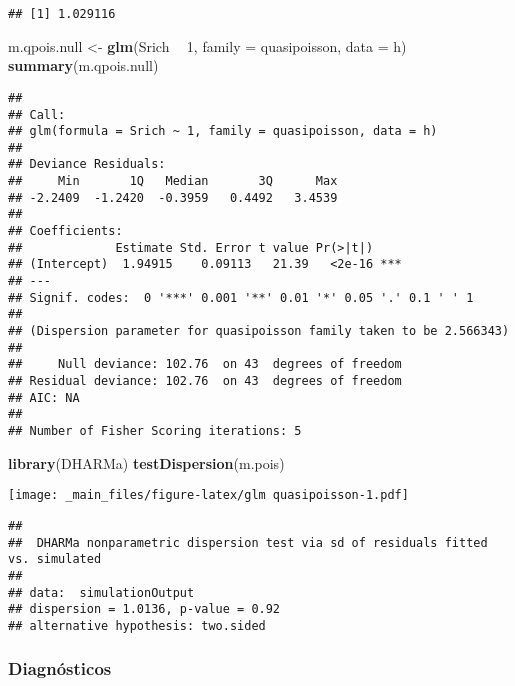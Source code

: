 \documentclass[
]{book}
\newenvironment{Shaded}{\begin{snugshade}}{\end{snugshade}}
\newcommand{\DataTypeTok}[1]{\textcolor[rgb]{0.13,0.29,0.53}{#1}}
\newcommand{\DecValTok}[1]{\textcolor[rgb]{0.00,0.00,0.81}{#1}}
\newcommand{\KeywordTok}[1]{\textcolor[rgb]{0.13,0.29,0.53}{\textbf{#1}}}
\newcommand{\NormalTok}[1]{#1}
\newcommand{\OperatorTok}[1]{\textcolor[rgb]{0.81,0.36,0.00}{\textbf{#1}}}
\newcommand{\StringTok}[1]{\textcolor[rgb]{0.31,0.60,0.02}{#1}}
\begin{document}
\begin{verbatim}
## [1] 1.029116
\end{verbatim}

\begin{Shaded}
\begin{Highlighting}[]
\NormalTok{m.qpois.null <-}\StringTok{ }\KeywordTok{glm}\NormalTok{(Srich }\OperatorTok{~}\StringTok{ }\DecValTok{1}\NormalTok{, }\DataTypeTok{family =}\NormalTok{ quasipoisson, }\DataTypeTok{data =}\NormalTok{ h)}
\KeywordTok{summary}\NormalTok{(m.qpois.null)}
\end{Highlighting}
\end{Shaded}

\begin{verbatim}
## 
## Call:
## glm(formula = Srich ~ 1, family = quasipoisson, data = h)
## 
## Deviance Residuals: 
##     Min       1Q   Median       3Q      Max  
## -2.2409  -1.2420  -0.3959   0.4492   3.4539  
## 
## Coefficients:
##             Estimate Std. Error t value Pr(>|t|)    
## (Intercept)  1.94915    0.09113   21.39   <2e-16 ***
## ---
## Signif. codes:  0 '***' 0.001 '**' 0.01 '*' 0.05 '.' 0.1 ' ' 1
## 
## (Dispersion parameter for quasipoisson family taken to be 2.566343)
## 
##     Null deviance: 102.76  on 43  degrees of freedom
## Residual deviance: 102.76  on 43  degrees of freedom
## AIC: NA
## 
## Number of Fisher Scoring iterations: 5
\end{verbatim}

\begin{Shaded}
\begin{Highlighting}[]
\KeywordTok{library}\NormalTok{(DHARMa)}
\KeywordTok{testDispersion}\NormalTok{(m.pois)}
\end{Highlighting}
\end{Shaded}

\texttt{[image: \_main\_files/figure-latex/glm quasipoisson-1.pdf]}

\begin{verbatim}
## 
##  DHARMa nonparametric dispersion test via sd of residuals fitted vs. simulated
## 
## data:  simulationOutput
## dispersion = 1.0136, p-value = 0.92
## alternative hypothesis: two.sided
\end{verbatim}

\hypertarget{diagnuxf3sticos-1}{%
\subsubsection{Diagnósticos}\label{diagnuxf3sticos-1}}
\end{document}
